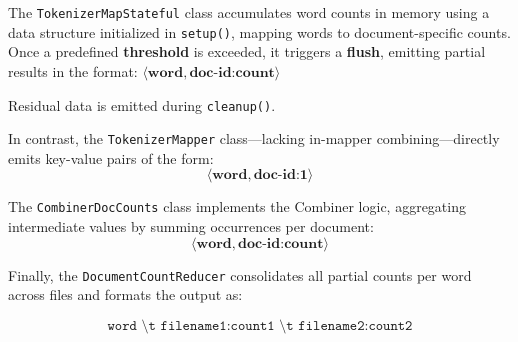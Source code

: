 The \texttt{TokenizerMapStateful} class accumulates word counts in memory using a data structure initialized in \texttt{setup()}, mapping words to document-specific counts. Once a predefined \textbf{threshold} is exceeded, it triggers a \textbf{flush}, emitting partial results in the format: $\langle \textbf{word}, \textbf{doc-id:count} \rangle$

Residual data is emitted during \texttt{cleanup()}.

In contrast, the \texttt{TokenizerMapper} class—lacking in-mapper combining—directly emits key-value pairs of the form:
\[
\langle \textbf{word}, \textbf{doc-id:1} \rangle
\]

The \texttt{CombinerDocCounts} class implements the Combiner logic, aggregating intermediate values by summing occurrences per document:
\[
\langle \textbf{word}, \textbf{doc-id:count} \rangle
\]

Finally, the \texttt{DocumentCountReducer} consolidates all partial counts per word across files and formats the output as:

\[
\texttt{word \textbackslash t filename1:count1 \textbackslash t filename2:count2}
\]
